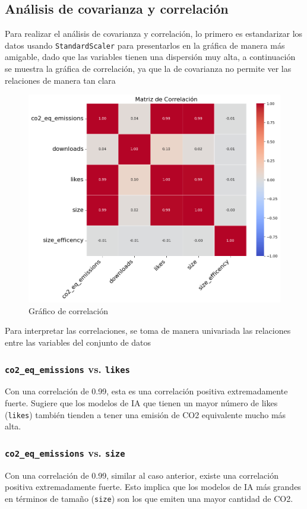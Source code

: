 \documentclass[journal]{IEEEtran}
\begin{document}
	\subsection{Análisis de covarianza y correlación}
	Para realizar el análisis de covarianza y correlación, lo primero es estandarizar los datos usando \texttt{StandardScaler} para presentarlos en la gráfica de manera más amigable, dado que las variables tienen una dispersión muy alta, a continuación se muestra la gráfica de correlación, ya que la de covarianza no permite ver las relaciones de manera tan clara
	
	\begin{figure}[H]
		\centering
		\includegraphics[width=0.8\columnwidth]{assets/correlation_matrix.png}
		\caption{Gráfico de correlación}
		\label{fig:pca_scatter}
	\end{figure}
	Para interpretar las correlaciones, se toma de manera univariada las relaciones entre las variables del conjunto de datos
	\subsubsection{\texttt{co2\_eq\_emissions} vs. \texttt{likes}}
	
	Con una correlación de 0.99, esta es una correlación positiva extremadamente fuerte. Sugiere que los modelos de IA que tienen un mayor número de likes
	(\texttt{likes}) también tienden a tener una emisión de CO2 equivalente mucho más alta.
	\subsubsection{\texttt{co2\_eq\_emissions} vs. \texttt{size}}
	Con una correlación de 0.99, similar al caso anterior, existe una correlación positiva extremadamente fuerte. Esto implica que los modelos de IA más grandes en términos de tamaño (\texttt{size}) son los que emiten una mayor cantidad de CO2.
	
\end{document}
